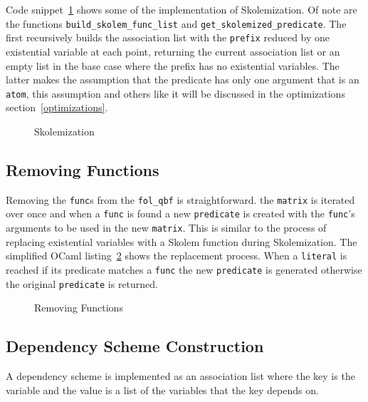 Code snippet~\ref{skolemizationimplementation} shows some of the implementation of Skolemization. Of note are the functions \texttt{build\_skolem\_func\_list} and \texttt{get\_skolemized\_predicate}. The first recursively builds the association list with the \texttt{prefix} reduced by one existential variable at each point, returning the current association list or an empty list in the base case where the prefix has no existential variables. The latter makes the assumption that the predicate has only one argument that is an \texttt{atom}, this assumption and others like it will be discussed in the optimizations section~\ref{optimizations}.

\begin{figure}[H]
\caption{Skolemization}
\label{skolemizationimplementation}
\begin{CenteredBox}

\end{CenteredBox}
\end{figure}

\subsection{Removing Functions}
Removing the \texttt{func}s from the \texttt{fol\_qbf} is straightforward. the \texttt{matrix} is iterated over once and when a \texttt{func} is found a new \texttt{predicate} is created with the \texttt{func}'s arguments to be used in the new \texttt{matrix}. This is similar to the process of replacing existential variables with a Skolem function during Skolemization. The simplified OCaml listing~\ref{removingfunctionsimplementation} shows the replacement process. When a \texttt{literal} is reached if its predicate matches a \texttt{func} the new \texttt{predicate} is generated otherwise the original \texttt{predicate} is returned.

\begin{figure}[H]
\caption{Removing Functions}
\label{removingfunctionsimplementation}
\begin{CenteredBox}

\end{CenteredBox}
\end{figure}

\subsection{Dependency Scheme Construction} \label{devdepscheme}
A dependency scheme is implemented as an association list where the key is the variable and the value is a list of the variables that the key depends on.

